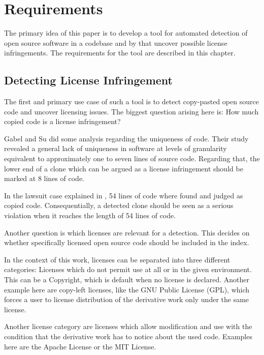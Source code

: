 
\chapter{Requirements}\label{chapter:requirements}
The primary idea of this paper is to develop a tool for automated detection of open source software in a codebase and by that uncover possible license infringements.
The requirements for the tool are described in this chapter.

\section{Detecting License Infringement}\label{section:requirements/detecting_infringement}
The first and primary use case of such a tool is to detect copy-pasted open source code and uncover licensing issues.
The biggest question arising here is: How much copied code is a license infringement?

Gabel and Su did some analysis regarding the uniqueness of code.
Their study \glqq revealed a general lack of uniqueness in software at levels of granularity equivalent to approximately one to seven lines of source code\grqq \cite{2010-gabel-su-source-code-uniqueness}.
Regarding that, the lower end of a clone which can be argued as a license infringement should be marked at 8 lines of code.

In the lawsuit case explained in \cite{mertzel2008copying}, 54 lines of code where found and judged as copied code.
Consequentially, a detected clone should be seen as a serious violation when it reaches the length of 54 lines of code.

Another question is which licenses are relevant for a detection.
This decides on whether specifically licensed open source code should be included in the index.

In the context of this work, licenses can be separated into three different categories:
Licenses which do not permit use at all or in the given environment.
This can be a Copyright, which is default when no license is declared.
Another example here are copy-left licenses, like the GNU Public License (GPL), which forces a user to license distribution of the derivative work only under the same license.

Another license category are licenses which allow modification and use with the condition that the derivative work has to notice about the used code.
Examples here are the Apache License or the MIT License.

